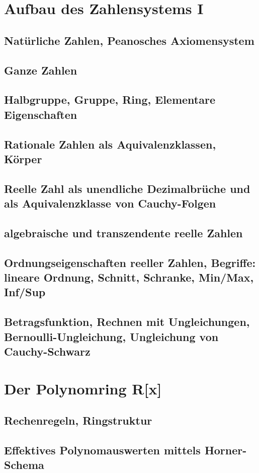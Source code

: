 \section{Aufbau des Zahlensystems I}
\subsection{Natürliche Zahlen, Peanosches Axiomensystem}
\subsection{Ganze Zahlen}
\subsection{Halbgruppe, Gruppe, Ring, Elementare Eigenschaften}
\subsection{Rationale Zahlen als Aquivalenzklassen, Körper}
\subsection{Reelle Zahl als unendliche Dezimalbrüche und als Aquivalenzklasse von Cauchy-Folgen}
\subsection{algebraische und transzendente reelle Zahlen}
\subsection{Ordnungseigenschaften reeller Zahlen, Begriffe: lineare Ordnung, Schnitt, Schranke, Min/Max, Inf/Sup}
\subsection{Betragsfunktion, Rechnen mit Ungleichungen, Bernoulli-Ungleichung, Ungleichung von Cauchy-Schwarz}

\section{Der Polynomring R[x]}
\subsection{Rechenregeln, Ringstruktur}
\subsection{Effektives Polynomauswerten mittels Horner-Schema}
